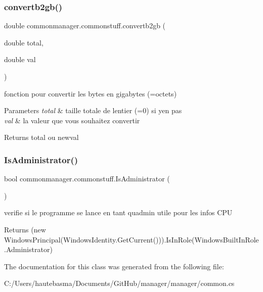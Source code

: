 \subsubsection{\texorpdfstring{convertb2gb()}{convertb2gb()}}
{\footnotesize\ttfamily double commonmanager.\+commonstuff.\+convertb2gb (\begin{DoxyParamCaption}\item[{double}]{total,  }\item[{double}]{val }\end{DoxyParamCaption})}



fonction pour convertir les bytes en gigabytes (=octets) 


\begin{DoxyParams}{Parameters}
{\em total} & taille totale de l\textquotesingle{}entier (=0) si y\textquotesingle{}en pas\\
\hline
{\em val} & la valeur que vous souhaitez convertir\\
\hline
\end{DoxyParams}
\begin{DoxyReturn}{Returns}
total ou newval
\end{DoxyReturn}
\mbox{\label{classcommonmanager_1_1commonstuff_ace86895848e42a2bea815db15d32837a}} 
\subsubsection{\texorpdfstring{Is\+Administrator()}{IsAdministrator()}}
{\footnotesize\ttfamily bool commonmanager.\+commonstuff.\+Is\+Administrator (\begin{DoxyParamCaption}{ }\end{DoxyParamCaption})}



verifie si le programme se lance en tant qu\textquotesingle{}admin utile pour les infos C\+PU 

\begin{DoxyReturn}{Returns}
(new Windows\+Principal(Windows\+Identity.\+Get\+Current())).Is\+In\+Role(Windows\+Built\+In\+Role.\+Administrator)
\end{DoxyReturn}


The documentation for this class was generated from the following file\+:\begin{DoxyCompactItemize}
\item 
C\+:/\+Users/hautebasma/\+Documents/\+Git\+Hub/manager/manager/common.\+cs\end{DoxyCompactItemize}
